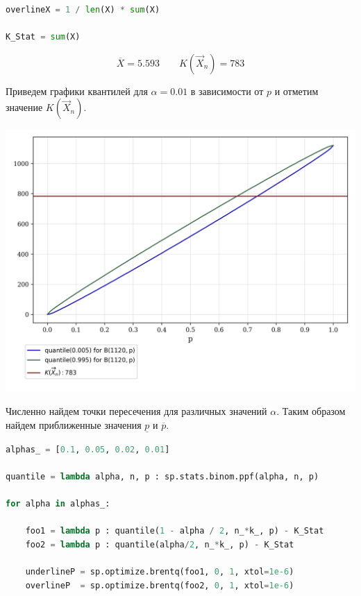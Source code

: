 \documentclass[a4paper, 14pt]{extarticle}
\begin{document}
\begin{center}
    \begin{lstlisting}[language=Python]
overlineX = 1 / len(X) * sum(X)

K_Stat = sum(X)
    \end{lstlisting}
\end{center}

\vspace{-10pt}

\begin{equation*}
    \overline{X} = 5.593 \qquad K(\overrightarrow{X}_n) = 783
\end{equation*}

Приведем графики квантилей для $\alpha = 0.01$ в зависимости от $p$ и отметим значение 
$K(\overrightarrow{X}_n)$.

\begin{center}
    \includegraphics[width=1\textwidth]{quantiles}
\end{center}

Численно найдем точки пересечения для различных значений $\alpha$. Таким образом найдем 
приближенные значения $\underline{p}$ и $\overline{p}$.

\begin{center}
    \begin{lstlisting}[language=Python]
alphas_ = [0.1, 0.05, 0.02, 0.01]

quantile = lambda alpha, n, p : sp.stats.binom.ppf(alpha, n, p)

for alpha in alphas_:

    foo1 = lambda p : quantile(1 - alpha / 2, n_*k_, p) - K_Stat
    foo2 = lambda p : quantile(alpha/2, n_*k_, p) - K_Stat

    underlineP = sp.optimize.brentq(foo1, 0, 1, xtol=1e-6)
    overlineP  = sp.optimize.brentq(foo2, 0, 1, xtol=1e-6)
    \end{lstlisting}
\end{center}
\end{document}
